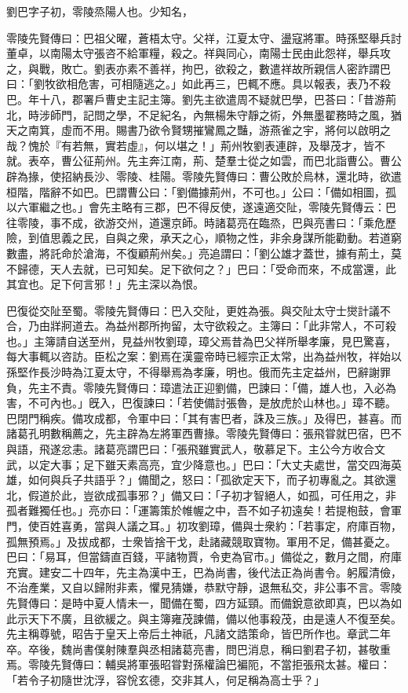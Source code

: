 
\begin{pinyinscope}
劉巴字子初，零陵烝陽人也。少知名，

零陵先賢傳曰：巴祖父曜，蒼梧太守。父祥，江夏太守、盪寇將軍。時孫堅舉兵討董卓，以南陽太守張咨不給軍糧，殺之。祥與同心，南陽士民由此怨祥，舉兵攻之，與戰，敗亡。劉表亦素不善祥，拘巴，欲殺之，數遣祥故所親信人密詐謂巴曰：「劉牧欲相危害，可相隨逃之。」如此再三，巴輒不應。具以報表，表乃不殺巴。年十八，郡署戶曹史主記主簿。劉先主欲遣周不疑就巴學，巴荅曰：「昔游荊北，時涉師門，記問之學，不足紀名，內無楊朱守靜之術，外無墨翟務時之風，猶天之南箕，虛而不用。賜書乃欲令賢甥摧鸞鳳之豔，游燕雀之宇，將何以啟明之哉？愧於『有若無，實若虛』，何以堪之！」荊州牧劉表連辟，及舉茂才，皆不就。表卒，曹公征荊州。先主奔江南，荊、楚羣士從之如雲，而巴北詣曹公。曹公辟為掾，使招納長沙、零陵、桂陽。零陵先賢傳曰：曹公敗於烏林，還北時，欲遣桓階，階辭不如巴。巴謂曹公曰：「劉備據荊州，不可也。」公曰：「備如相圖，孤以六軍繼之也。」會先主略有三郡，巴不得反使，遂遠適交阯，零陵先賢傳云：巴往零陵，事不成，欲游交州，道還京師。時諸葛亮在臨烝，巴與亮書曰：「乘危歷險，到值思義之民，自與之衆，承天之心，順物之性，非余身謀所能勸動。若道窮數盡，將託命於滄海，不復顧荊州矣。」亮追謂曰：「劉公雄才蓋世，據有荊土，莫不歸德，天人去就，已可知矣。足下欲何之？」巴曰：「受命而來，不成當還，此其宜也。足下何言邪！」先主深以為恨。

巴復從交阯至蜀。零陵先賢傳曰：巴入交阯，更姓為張。與交阯太守士爕計議不合，乃由牂牁道去。為益州郡所拘留，太守欲殺之。主簿曰：「此非常人，不可殺也。」主簿請自送至州，見益州牧劉璋，璋父焉昔為巴父祥所舉孝廉，見巴驚喜，每大事輒以咨訪。臣松之案：劉焉在漢靈帝時已經宗正太常，出為益州牧，祥始以孫堅作長沙時為江夏太守，不得舉焉為孝廉，明也。俄而先主定益州，巴辭謝罪負，先主不責。零陵先賢傳曰：璋遣法正迎劉備，巴諫曰：「備，雄人也，入必為害，不可內也。」旣入，巴復諫曰：「若使備討張魯，是放虎於山林也。」璋不聽。巴閉門稱疾。備攻成都，令軍中曰：「其有害巴者，誅及三族。」及得巴，甚喜。而諸葛孔明數稱薦之，先主辟為左將軍西曹掾。零陵先賢傳曰：張飛甞就巴宿，巴不與語，飛遂忿恚。諸葛亮謂巴曰：「張飛雖實武人，敬慕足下。主公今方收合文武，以定大事；足下雖天素高亮，宜少降意也。」巴曰：「大丈夫處世，當交四海英雄，如何與兵子共語乎？」備聞之，怒曰：「孤欲定天下，而子初專亂之。其欲還北，假道於此，豈欲成孤事邪？」備又曰：「子初才智絕人，如孤，可任用之，非孤者難獨任也。」亮亦曰：「運籌策於帷幄之中，吾不如子初遠矣！若提枹鼓，會軍門，使百姓喜勇，當與人議之耳。」初攻劉璋，備與士衆約：「若事定，府庫百物，孤無預焉。」及拔成都，士衆皆捨干戈，赴諸藏競取寶物。軍用不足，備甚憂之。巴曰：「易耳，但當鑄直百錢，平諸物賈，令吏為官巿。」備從之，數月之間，府庫充實。建安二十四年，先主為漢中王，巴為尚書，後代法正為尚書令。躬履清儉，不治產業，又自以歸附非素，懼見猜嫌，恭默守靜，退無私交，非公事不言。零陵先賢傳曰：是時中夏人情未一，聞備在蜀，四方延頸。而備銳意欲即真，巴以為如此示天下不廣，且欲緩之。與主簿雍茂諫備，備以他事殺茂，由是遠人不復至矣。先主稱尊號，昭告于皇天上帝后土神祇，凡諸文誥策命，皆巴所作也。章武二年卒。卒後，魏尚書僕射陳羣與丞相諸葛亮書，問巴消息，稱曰劉君子初，甚敬重焉。零陵先賢傳曰：輔吳將軍張昭甞對孫權論巴褊阨，不當拒張飛太甚。權曰：「若令子初隨世沈浮，容恱玄德，交非其人，何足稱為高士乎？」


\end{pinyinscope}